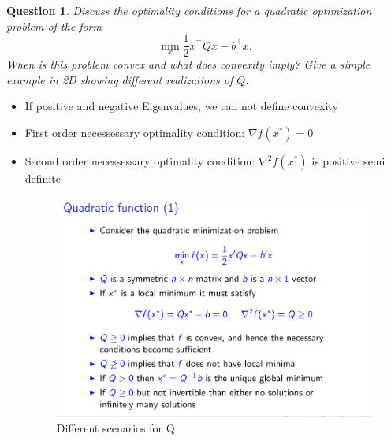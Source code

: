 \documentclass{article}
\newtheorem{question}{Question}
\newcommand{\T}[1]{#1^{\top}}
\begin{document}
\begin{question}
  Discuss the optimality conditions for a quadratic optimization problem of the form
  \[ \min_x \frac{1}{2} \T{x} Q x - \T{b} x.
  \]
  When is this problem convex and what does convexity imply? Give a simple example in 2D showing
  different realizations of \(Q\).
\end{question}
\begin{itemize}
\item If positive and negative Eigenvalues, we can not define convexity
\item First order necessessary optimality condition: $\nabla f(x^*) = 0$
\item Second order necessessary optimality condition: $\nabla^2 f(x^*) $ is positive semi definite

  \begin{figure}[H]
    \includegraphics[width=\textwidth]{cond_quad_q.png}
    \caption{Different scenarios for Q\label{fig:cond_quad}}
  \end{figure}	
\end{itemize}
\end{document}
